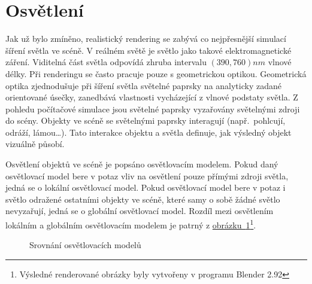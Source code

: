 \documentclass[czech,master]{diploma}
\newcommand{\intervaloo}[2]{\left({{#1},{#2}}\right)}
\begin{document}
\section{Osvětlení}
Jak už bylo zmíněno, realistický rendering se zabývá co nejpřesnější simulací šíření světla ve scéně. V reálném světě je světlo jako takové elektromagnetické záření. Viditelná část světla odpovídá zhruba intervalu \(\intervaloo{390}{760}nm\) vlnové délky. Při renderingu se často pracuje pouze s geometrickou optikou. Geometrická optika zjednodušuje při šíření světla světelné paprsky na analyticky zadané orientované úsečky, zanedbává vlastnosti vycházející z vlnové podstaty světla. Z pohledu počítačové simulace jsou světelné paprsky vyzařovány světelnými zdroji do scény. Objekty ve scéně se světelnými paprsky interagují (např.~pohlcují, odráží, lámou\dots). Tato interakce objektu a světla definuje, jak výsledný objekt vizuálně působí.\par
Osvětlení objektů ve scéně je popsáno osvětlovacím modelem. Pokud daný osvětlovací model bere v potaz vliv na osvětlení pouze přímými zdroji světla, jedná se o lokální osvětlovací model. Pokud osvětlovací model bere v potaz i světlo odražené ostatními objekty ve scéně, které samy o sobě žádné světlo nevyzařují, jedná se o globální osvětlovací model. Rozdíl mezi osvětlením lokálním a globálním osvětlovacím modelem je patrný z \hyperref[fig:localVsGlobalIllum]{obrázku~\ref{fig:localVsGlobalIllum}}\footnote{Výsledné renderované obrázky byly vytvořeny v programu Blender 2.92}.

\begin{figure}[ht]%
  \centering
  \qquad
  \caption{Srovnání osvětlovacích modelů}%
  \label{fig:localVsGlobalIllum}%
\end{figure}
\end{document}
